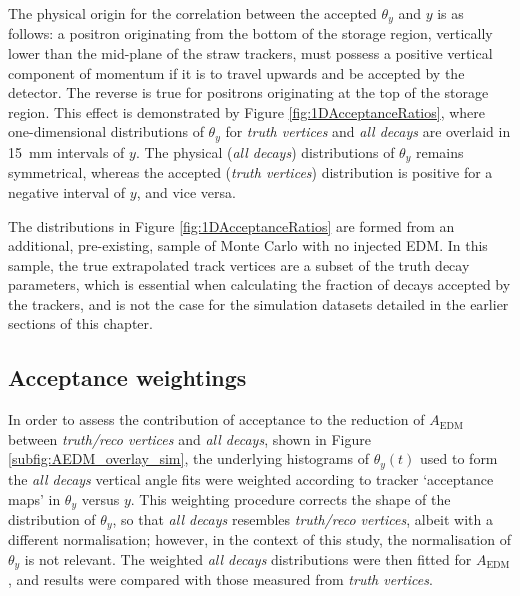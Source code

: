The physical origin for the correlation between the accepted $\theta_{y}$ and $y$ is as follows: a positron originating from the bottom of the storage region, vertically lower than the mid-plane of the straw trackers, must possess a positive vertical component of momentum if it is to travel upwards and be accepted by the detector. The reverse is true for positrons originating at the top of the storage region. This effect is demonstrated by Figure \ref{fig:1DAcceptanceRatios}, where one-dimensional distributions of $\theta_{y}$ for \textit{truth vertices} and \textit{all decays} are overlaid in \SI{15}{\milli\metre} intervals of $y$. The physical (\textit{all decays}) distributions of $\theta_{y}$ remains symmetrical, whereas the accepted (\textit{truth vertices}) distribution is positive for a negative interval of $y$, and vice versa. 

The distributions in Figure \ref{fig:1DAcceptanceRatios} are formed from an additional, pre-existing, sample of Monte Carlo with no injected EDM. In this sample, the true extrapolated track vertices are a subset of the truth decay parameters, which is essential when calculating the fraction of decays accepted by the trackers, and is not the case for the simulation datasets detailed in the earlier sections of this chapter. 

\subsection{Acceptance weightings}\label{sec:AcceptanceWeightings}

In order to assess the contribution of acceptance to the reduction of $A_{\text{EDM}}$ between \textit{truth/reco vertices} and \textit{all decays}, shown in Figure \ref{subfig:AEDM_overlay_sim}, the underlying histograms of $\theta_{y}(t)$ used to form the \textit{all decays} vertical angle fits were weighted according to tracker `acceptance maps' in $\theta_{y}$ versus $y$. This weighting procedure corrects the shape of the distribution of $\theta_{y}$, so that \textit{all decays} resembles \textit{truth/reco vertices}, albeit with a different normalisation; however, in the context of this study, the normalisation of $\theta_{y}$ is not relevant. The weighted \textit{all decays} distributions were then fitted for $A_{\text{EDM}}$, and results were compared with those measured from \textit{truth vertices}.%

